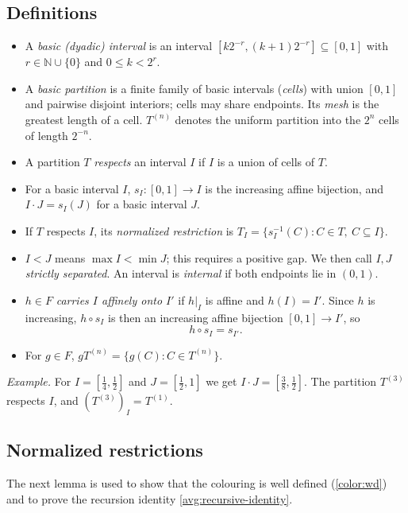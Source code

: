 \documentclass[11pt]{article}
\newcommand{\N}{\mathbb N}
\theoremstyle{definition}
\numberwithin{equation}{section}
\begin{document}
\subsection{Definitions}

\begin{itemize}
\item A \emph{basic (dyadic) interval} is an interval
\([k2^{-r},(k+1)2^{-r}]\subseteq[0,1]\) with \(r\in\N\cup\{0\}\) and
\(0\le k<2^r\).
\item A \emph{basic partition} is a finite family of basic intervals
(\emph{cells}) with union \([0,1]\) and pairwise disjoint interiors; cells
may share endpoints. Its \emph{mesh} is the greatest length of a cell.
\(T^{(n)}\) denotes the uniform partition into the \(2^n\) cells of length
\(2^{-n}\).
\item A partition \(T\) \emph{respects} an interval \(I\) if \(I\) is a
union of cells of \(T\).
\item For a basic interval \(I\), \(s_I:[0,1]\to I\) is the increasing
affine bijection, and \(I\cdot J=s_I(J)\) for a basic interval \(J\).
\item If \(T\) respects \(I\), its \emph{normalized restriction} is
\(T_I=\{s_I^{-1}(C):C\in T,\ C\subseteq I\}\).
\item \(I<J\) means \(\max I<\min J\); this requires a positive gap. We
then call \(I,J\) \emph{strictly separated}. An interval is \emph{internal}
if both endpoints lie in \((0,1)\).
\item \(h\in F\) \emph{carries \(I\) affinely onto \(I'\)} if \(h|_I\) is
affine and \(h(I)=I'\). Since \(h\) is increasing, \(h\circ s_I\) is then an
increasing affine bijection \([0,1]\to I'\), so
\begin{equation}\label{dyad:chart}
  h\circ s_I=s_{I'}.
\end{equation}
\item For \(g\in F\), \(gT^{(n)}=\{g(C):C\in T^{(n)}\}\).
\end{itemize}

\emph{Example.} For \(I=[\tfrac14,\tfrac12]\) and \(J=[\tfrac12,1]\) we get
\(I\cdot J=[\tfrac38,\tfrac12]\). The partition \(T^{(3)}\) respects \(I\),
and \((T^{(3)})_I=T^{(1)}\).

\subsection{Normalized restrictions}

The next lemma is used to show that the colouring is well defined
(\cref{color:wd}) and to prove the recursion identity
\eqref{avg:recursive-identity}.
\end{document}
